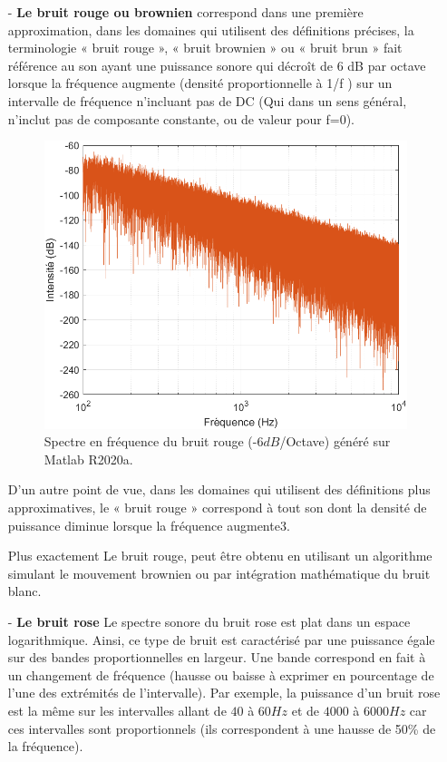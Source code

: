 \documentclass[conference,onecolumn]{IEEEtran}
\begin{document}
\begin{itemize} %

    \item[-] \textbf{Le bruit rouge ou brownien} correspond dans une première approximation, dans les domaines qui utilisent des définitions précises, la terminologie « bruit rouge », « bruit brownien » ou « bruit brun » fait référence au son ayant une puissance sonore qui décroît de 6 dB par octave lorsque la fréquence augmente (densité proportionnelle à 1/f ) sur un intervalle de fréquence n'incluant pas de DC (Qui dans un sens général, n'inclut pas de composante constante, ou de valeur pour f=0). 

    \begin{figure}[H]
        \centering
        \includegraphics[scale=0.5]{img7.png}
        \caption{Spectre en fréquence du bruit rouge (-$6dB$/Octave) généré sur Matlab R2020a.}
    \end{figure}

    D’un autre point de vue, dans les domaines qui utilisent des définitions plus approximatives, le « bruit rouge » correspond à tout son dont la densité de puissance diminue lorsque la fréquence augmente3. 

    Plus exactement Le bruit rouge, peut être obtenu en utilisant un algorithme simulant le mouvement brownien ou par intégration mathématique du bruit blanc.
    
    \item[-] \textbf{Le bruit rose} Le spectre sonore du bruit rose est plat dans un espace logarithmique. Ainsi, ce type de bruit est caractérisé par une puissance égale sur des bandes proportionnelles en largeur. Une bande correspond en fait à un changement de fréquence (hausse ou baisse à exprimer en pourcentage de l’une des extrémités de l’intervalle). Par exemple, la puissance d’un bruit rose est la même sur les intervalles allant de $40$ à $60 Hz$ et de $4 000$ à $6 000 Hz$ car ces intervalles sont proportionnels (ils correspondent à une hausse de 50\% de la fréquence).


\end{itemize}
\end{document}
